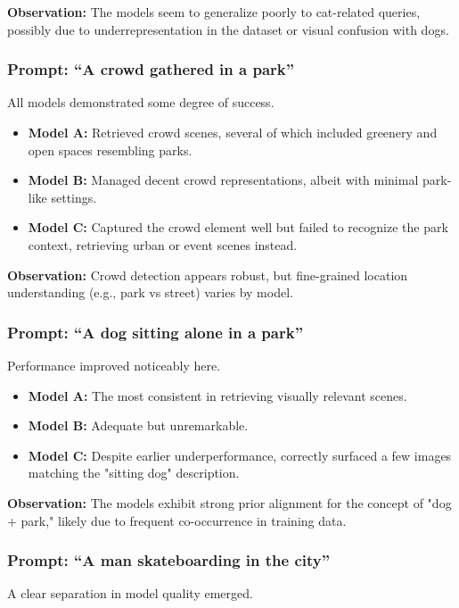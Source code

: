 \documentclass[11pt]{article}
\begin{document}
\textbf{Observation:} The models seem to generalize poorly to cat-related queries, possibly due to underrepresentation in the dataset or visual confusion with dogs.

\subsubsection{Prompt: ``A crowd gathered in a park''}
All models demonstrated some degree of success.

\begin{itemize}
    \item \textbf{Model A:} Retrieved crowd scenes, several of which included greenery and open spaces resembling parks.
    \item \textbf{Model B:} Managed decent crowd representations, albeit with minimal park-like settings.
    \item \textbf{Model C:} Captured the crowd element well but failed to recognize the park context, retrieving urban or event scenes instead.
\end{itemize}

\textbf{Observation:} Crowd detection appears robust, but fine-grained location understanding (e.g., park vs street) varies by model.

\subsubsection{Prompt: ``A dog sitting alone in a park''}
Performance improved noticeably here.

\begin{itemize}
    \item \textbf{Model A:} The most consistent in retrieving visually relevant scenes.
    \item \textbf{Model B:} Adequate but unremarkable.
    \item \textbf{Model C:} Despite earlier underperformance, correctly surfaced a few images matching the "sitting dog" description.
\end{itemize}

\textbf{Observation:} The models exhibit strong prior alignment for the concept of "dog + park," likely due to frequent co-occurrence in training data.

\subsubsection{Prompt: ``A man skateboarding in the city''}
A clear separation in model quality emerged.
\end{document}
